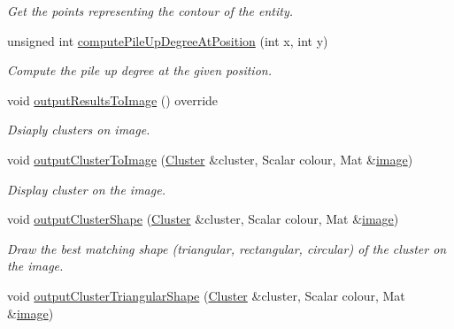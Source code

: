 \begin{DoxyCompactItemize}
\begin{DoxyCompactList}\small\item\em \-Get the points representing the contour of the entity. \end{DoxyCompactList}\item 
unsigned int \hyperlink{classmultiscale_1_1analysis_1_1SimulationClusterDetector_a2252829af367a55af95bee3cf814b87e}{compute\-Pile\-Up\-Degree\-At\-Position} (int x, int y)
\begin{DoxyCompactList}\small\item\em \-Compute the pile up degree at the given position. \end{DoxyCompactList}\item 
void \hyperlink{classmultiscale_1_1analysis_1_1SimulationClusterDetector_a909e1e53836f1688ebe312c5f7fb70b5}{output\-Results\-To\-Image} () override
\begin{DoxyCompactList}\small\item\em \-Dsiaply clusters on image. \end{DoxyCompactList}\item 
void \hyperlink{classmultiscale_1_1analysis_1_1SimulationClusterDetector_a0e29be5f9a15899f710f48aaf6c049f0}{output\-Cluster\-To\-Image} (\hyperlink{classmultiscale_1_1analysis_1_1Cluster}{\-Cluster} \&cluster, \-Scalar colour, \-Mat \&\hyperlink{classmultiscale_1_1analysis_1_1Detector_a523830a6cfe409694ce8327c3c736fbd}{image})
\begin{DoxyCompactList}\small\item\em \-Display cluster on the image. \end{DoxyCompactList}\item 
void \hyperlink{classmultiscale_1_1analysis_1_1SimulationClusterDetector_a8dc451d799404ba7ecd72d85d2f7e955}{output\-Cluster\-Shape} (\hyperlink{classmultiscale_1_1analysis_1_1Cluster}{\-Cluster} \&cluster, \-Scalar colour, \-Mat \&\hyperlink{classmultiscale_1_1analysis_1_1Detector_a523830a6cfe409694ce8327c3c736fbd}{image})
\begin{DoxyCompactList}\small\item\em \-Draw the best matching shape (triangular, rectangular, circular) of the cluster on the image. \end{DoxyCompactList}\item 
void \hyperlink{classmultiscale_1_1analysis_1_1SimulationClusterDetector_a9894288a54c8e3fdeff3917d81e2ad9b}{output\-Cluster\-Triangular\-Shape} (\hyperlink{classmultiscale_1_1analysis_1_1Cluster}{\-Cluster} \&cluster, \-Scalar colour, \-Mat \&\hyperlink{classmultiscale_1_1analysis_1_1Detector_a523830a6cfe409694ce8327c3c736fbd}{image})

\end{DoxyCompactItemize}
